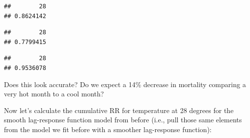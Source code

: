 \documentclass[
]{book}
\newenvironment{Shaded}{\begin{snugshade}}{\end{snugshade}}
\newcommand{\DecValTok}[1]{\textcolor[rgb]{0.00,0.00,0.81}{#1}}
\newcommand{\NormalTok}[1]{#1}
\newcommand{\SpecialCharTok}[1]{\textcolor[rgb]{0.00,0.00,0.00}{#1}}
\begin{document}
\begin{Shaded}
\end{Shaded}

\begin{verbatim}
##        28 
## 0.8624142
\end{verbatim}

\begin{Shaded}
\end{Shaded}

\begin{verbatim}
##        28 
## 0.7799415
\end{verbatim}

\begin{Shaded}
\end{Shaded}

\begin{verbatim}
##        28 
## 0.9536078
\end{verbatim}

Does this look accurate? Do we expect a 14\% decrease in mortality comparing a very hot month to a cool month?

Now let's calculate the cumulative RR for temperature at 28 degrees for the smooth lag-response function model from before (i.e., pull those same elements from the model we fit before
with a smoother lag-response function):

\begin{Shaded}
\end{Shaded}
\end{document}

